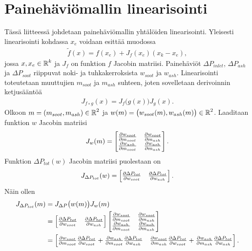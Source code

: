 
\chapter{Painehäviömallin linearisointi}%
\label{ch:linearisointi}

Tässä liitteessä johdetaan painehäviömallin yhtälöiden linearisointi. Yleisesti linearisointi kohdassa \(x_e\) voidaan esittää muodossa
\begin{align}
    \tilde{f}(x) = f(x_e) +J_f (x_e) (x_k-x_e),
\end{align}
jossa \(x, x_e \in \operatorname{\mathbb{R}}^k\) ja \(J_f\) on funktion \(f\) Jacobin matriisi. 
Painehäviöt \(\Delta P_{inlet}\), \(\Delta P_{ash}\) ja \(\Delta P_{soot}\) riippuvat noki- ja tuhkakerroksista \(w_{soot}\) ja \(w_{ash}\). 
Linearisointi toteutetaan muuttujien \(m_{soot}\) ja \( m_{ash}\) suhteen, joten
sovelletaan derivoinnin ketjusääntöä
\begin{align}
    J_{f \circ g}(x) = J_f\big(g(x)\big)  J_g(x).
\end{align}
Olkoon \(m = \left(m_{soot}, m_{ash}\right) \in \operatorname{\mathbb{R}}^2\) ja \(w(m) = \big(w_{soot}(m), w_{ash}(m)  \big) \in \operatorname{\mathbb{R}}^2\). Laaditaan funktion \(w\) Jacobin matriisi
\begin{align}
    J_w(m)=
    \begin{bmatrix} 
        \frac{\partial w_{soot}}{\partial m_{soot}} & \frac{\partial w_{soot}}{\partial m_{ash}}
    \\  \frac{\partial w_{ash}}{\partial m_{soot}} & \frac{\partial w_{ash}}{\partial m_{ash}}
     \end{bmatrix}.
\end{align}
 Funktion \(\Delta P_{tot}(w)\) Jacobin matriisi puolestaan on 
\begin{align}
    J_{\Delta P_{tot}}(w) = \begin{bmatrix}   \frac{\partial \Delta P_{tot}}{\partial w_{soot}}
    &   \frac{\partial \Delta P_{tot}}{\partial w_{ash}}
     \end{bmatrix}.
\end{align}
Näin ollen 
\begin{align}
    \begin{split}
        J_{\Delta P_{tot}}(m)&=
        J_{\Delta P}\big(w(m)\big)  J_{w}(m)
\\ &=
    \begin{bmatrix}   
        \frac{\partial \Delta P_{tot}}{\partial w_{soot}}
        &   
        \frac{\partial \Delta P_{tot}}{\partial w_{ash}}
         \end{bmatrix}
    \begin{bmatrix} 
        \frac{\partial w_{soot}}{\partial m_{soot}} & \frac{\partial w_{soot}}{\partial m_{ash}}
        \\ 
        \frac{\partial w_{ash}}{\partial m_{soot}} & \frac{\partial w_{ash}}{\partial m_{ash}}
         \end{bmatrix}
\\ &=
    \begin{bmatrix} 
        \frac{\partial w_{soot}}{\partial m_{soot}}
        \frac{\partial \Delta P_{tot}}{\partial w_{soot}}
        +
        \frac{\partial w_{ash}}{\partial m_{soot}}
        \frac{\partial \Delta P_{tot}}{\partial w_{ash}}
        &
        \frac{\partial w_{soot}}{\partial m_{ash}}
        \frac{\partial \Delta P_{tot}}{\partial w_{soot}}
        +
        \frac{\partial w_{ash}}{\partial m_{ash}}
        \frac{\partial \Delta P_{tot}}{\partial w_{ash}}
     \end{bmatrix}.
    \end{split}
\end{align}


